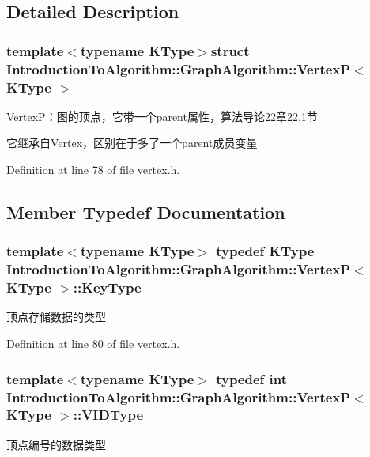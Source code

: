 \subsection{Detailed Description}
\subsubsection*{template$<$typename K\+Type$>$struct Introduction\+To\+Algorithm\+::\+Graph\+Algorithm\+::\+Vertex\+P$<$ K\+Type $>$}

Vertex\+P：图的顶点，它带一个parent属性，算法导论22章22.1节 

它继承自\+Vertex，区别在于多了一个parent成员变量 

Definition at line 78 of file vertex.\+h.



\subsection{Member Typedef Documentation}
\hypertarget{struct_introduction_to_algorithm_1_1_graph_algorithm_1_1_vertex_p_aa48c040b6a076ae4e1cbd5cd51f42241}{}
\subsubsection[{Key\+Type}]{\setlength{\rightskip}{0pt plus 5cm}template$<$typename K\+Type$>$ typedef K\+Type {\bf Introduction\+To\+Algorithm\+::\+Graph\+Algorithm\+::\+Vertex\+P}$<$ K\+Type $>$\+::{\bf Key\+Type}}\label{struct_introduction_to_algorithm_1_1_graph_algorithm_1_1_vertex_p_aa48c040b6a076ae4e1cbd5cd51f42241}
顶点存储数据的类型 

Definition at line 80 of file vertex.\+h.

\hypertarget{struct_introduction_to_algorithm_1_1_graph_algorithm_1_1_vertex_p_aa15e0b509772ea84c9b5a211079d641b}{}
\subsubsection[{V\+I\+D\+Type}]{\setlength{\rightskip}{0pt plus 5cm}template$<$typename K\+Type$>$ typedef int {\bf Introduction\+To\+Algorithm\+::\+Graph\+Algorithm\+::\+Vertex\+P}$<$ K\+Type $>$\+::{\bf V\+I\+D\+Type}}\label{struct_introduction_to_algorithm_1_1_graph_algorithm_1_1_vertex_p_aa15e0b509772ea84c9b5a211079d641b}
顶点编号的数据类型 

